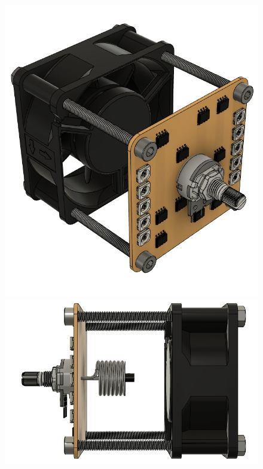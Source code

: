 \documentclass{METUHW} %
\begin{document}
\begin{figure}[H]
\centering

\includegraphics[scale=0.20]{figure/fig4.png}
\includegraphics[scale=0.30]{figure/fig6.png}

\end{figure}
\end{document}
